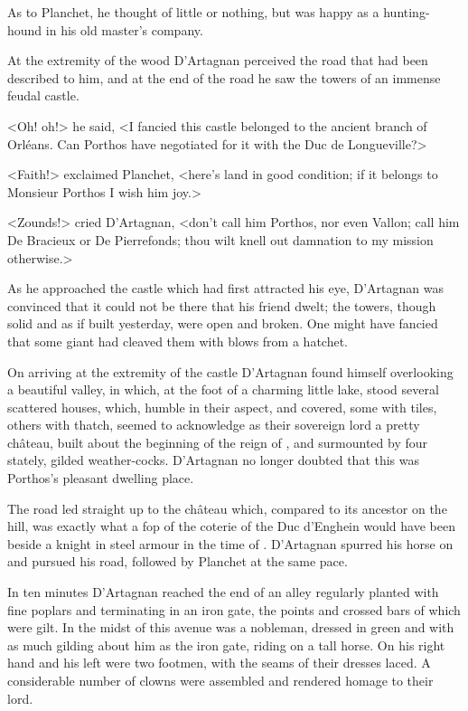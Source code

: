 As to Planchet, he thought of little or nothing, but was happy as a hunting-hound in his old master's company.

At the extremity of the wood D'Artagnan perceived the road that had been described to him, and at the end of the road he saw the towers of an immense feudal castle.

<Oh! oh!> he said, <I fancied this castle belonged to the ancient branch of Orléans. Can Porthos have negotiated for it with the Duc de Longueville?>

<Faith!> exclaimed Planchet, <here's land in good condition; if it belongs to Monsieur Porthos I wish him joy.>

<Zounds!> cried D'Artagnan, <don't call him Porthos, nor even Vallon; call him De Bracieux or De Pierrefonds; thou wilt knell out damnation to my mission otherwise.>

As he approached the castle which had first attracted his eye, D'Artagnan was convinced that it could not be there that his friend dwelt; the towers, though solid and as if built yesterday, were open and broken. One might have fancied that some giant had cleaved them with blows from a hatchet.

On arriving at the extremity of the castle D'Artagnan found himself overlooking a beautiful valley, in which, at the foot of a charming little lake, stood several scattered houses, which, humble in their aspect, and covered, some with tiles, others with thatch, seemed to acknowledge as their sovereign lord a pretty château, built about the beginning of the reign of , and surmounted by four stately, gilded weather-cocks. D'Artagnan no longer doubted that this was Porthos's pleasant dwelling place.

The road led straight up to the château which, compared to its ancestor on the hill, was exactly what a fop of the coterie of the Duc d'Enghein would have been beside a knight in steel armour in the time of . D'Artagnan spurred his horse on and pursued his road, followed by Planchet at the same pace.

In ten minutes D'Artagnan reached the end of an alley regularly planted with fine poplars and terminating in an iron gate, the points and crossed bars of which were gilt. In the midst of this avenue was a nobleman, dressed in green and with as much gilding about him as the iron gate, riding on a tall horse. On his right hand and his left were two footmen, with the seams of their dresses laced. A considerable number of clowns were assembled and rendered homage to their lord.

